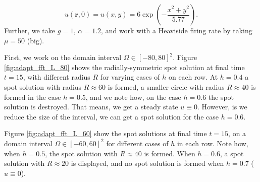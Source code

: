 \documentclass{uonmathreport}
\begin{document}
\begin{equation}
	u(\textbf{r}, 0) = u(x,y) = 6\exp{\left(-\frac{x^2+y^2}{5.77}\right)}.
\end{equation}
Further, we take $g=1$, $\alpha=1.2$, and work with a Heaviside firing rate by taking $\mu=50$ (big).

First, we work on the domain interval $\Omega \in [-80, 80]^2$. Figure \ref{fig:adapt_fft_L_80} shows the radially-symmetric spot solution at final time $t=15$, with different radius $R$ for varying cases of $h$ on each row. At $h=0.4$ a spot solution with radius $R \approx 60$ is formed, a smaller circle with radius $R \approx 40$ is formed in the case $h=0.5$, and we note how, on the case $h=0.6$ the spot solution is destroyed. That means, we get a steady state $u \equiv 0$. However, is we reduce the size of the interval, we can get a spot solution for the case $h=0.6$.

Figure \ref{fig:adapt_fft_L_60} show the spot solutions at final time $t=15$, on a domain interval $\Omega \in [-60, 60]^2$ for different cases of $h$ in each row. Note how, when $h=0.5$, the spot solution with $R\approx40$ is formed. When $h=0.6$, a spot solution with $R\approx20$ is displayed, and no spot solution is formed when $h=0.7$ ($u \equiv 0$).
\end{document}
